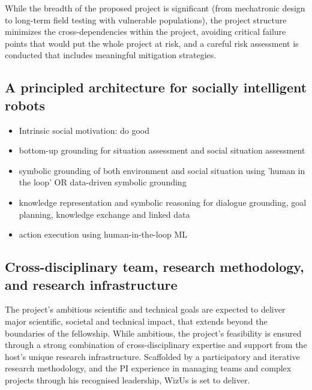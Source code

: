 \documentclass[11pt]{article}
\newcommand{\project}{WizUs\xspace}
\begin{document}
While the breadth of the proposed project is significant (from
mechatronic design to long-term field testing with vulnerable
populations), the project structure minimizes the cross-dependencies
within the project, avoiding critical failure points that would put the
whole project at risk, and a careful risk assessment is conducted that
includes meaningful mitigation strategies.




\subsection{A principled architecture for socially intelligent robots}


\begin{itemize}
    \item Intrinsic social motivation: do good
    \item bottom-up grounding for situation assessment and social situation
        assessment
    \item symbolic grounding of both environment and social situation using
        'human in the loop' OR data-driven symbolic grounding
    \item knowledge representation and symbolic reasoning for dialogue
        grounding, goal planning, knowledge exchange and linked data
    \item action execution using human-in-the-loop ML
\end{itemize}


\subsection{Cross-disciplinary team, research methodology, and research
infrastructure}

The project's ambitious scientific and technical goals are expected to deliver
major scientific, societal and technical impact, that extends beyond the
boundaries of the fellowship. While ambitious, the project's feasibility is
ensured through a strong combination of cross-disciplinary expertise and
support from the host's unique research infrastructure. Scaffolded by a
participatory and iterative research methodology, and the PI experience in
managing teams and complex projects through his recognised leadership, \project
is set to deliver.
\end{document}
